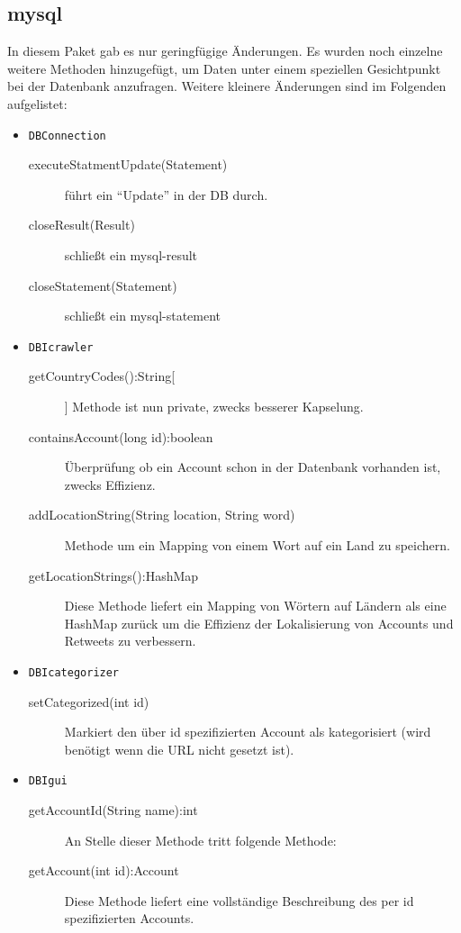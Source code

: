 \subsection{mysql}
In diesem Paket gab es nur geringfügige Änderungen. Es wurden noch einzelne weitere Methoden hinzugefügt, um Daten unter einem speziellen Gesichtpunkt bei der Datenbank anzufragen. Weitere kleinere Änderungen sind im Folgenden aufgelistet:
\begin{itemize}
	\item \lstinline{DBConnection}
	\begin{description}
		\item[executeStatmentUpdate(Statement)] führt ein "`Update"' in der DB durch.
		\item[closeResult(Result)] schließt ein mysql-result
		\item[closeStatement(Statement)] schließt ein mysql-statement
	\end{description}
			\item \lstinline{DBIcrawler}
	\begin{description}
		\item[getCountryCodes():String[]] Methode ist nun private, zwecks besserer Kapselung.
		\item[containsAccount(long id):boolean] Überprüfung ob ein Account schon in der Datenbank vorhanden ist, zwecks Effizienz.	
		\item[addLocationString(String location, String word)] Methode um ein Mapping von einem Wort auf ein Land zu speichern.
		\item[getLocationStrings():HashMap] Diese Methode liefert ein Mapping von Wörtern auf Ländern als eine HashMap zurück um die Effizienz der Lokalisierung von Accounts und Retweets zu verbessern.
	\end{description}
		\item \lstinline{DBIcategorizer}
	\begin{description}
		\item[setCategorized(int id)] Markiert den über id spezifizierten Account als kategorisiert (wird benötigt wenn die URL nicht gesetzt ist).
	\end{description}
			\item \lstinline{DBIgui}
	\begin{description}
		\item[getAccountId(String name):int] An Stelle dieser Methode tritt folgende Methode:
		\item[getAccount(int id):Account] Diese Methode liefert eine vollständige Beschreibung des per id spezifizierten Accounts.

\end{description}
\end{itemize}
